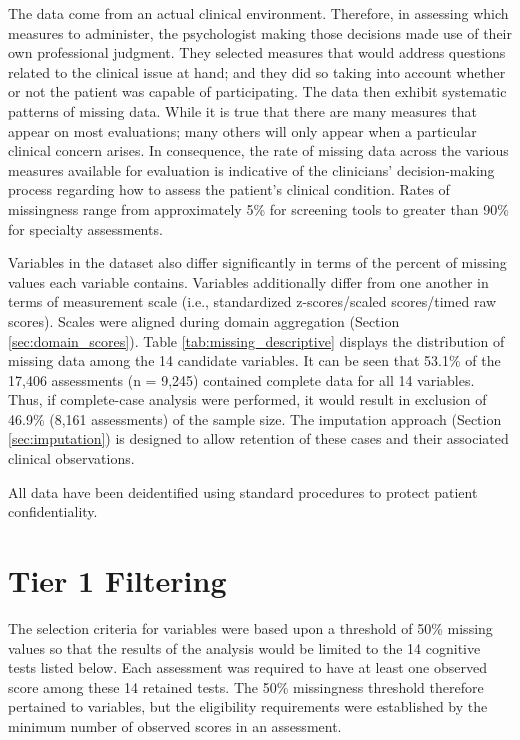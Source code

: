 The data come from an actual clinical environment. Therefore, in assessing which measures to administer, the psychologist making those decisions made use of their own professional judgment. They selected measures that would address questions related to the clinical issue at hand; and they did so taking into account whether or not the patient was capable of participating. The data then exhibit systematic patterns of missing data. While it is true that there are many measures that appear on most evaluations; many others will only appear when a particular clinical concern arises. In consequence, the rate of missing data across the various measures available for evaluation is indicative of the clinicians' decision-making process regarding how to assess the patient's clinical condition. Rates of missingness range from approximately 5\% for screening tools to greater than 90\% for specialty assessments.

Variables in the dataset also differ significantly in terms of the percent of missing values each variable contains. Variables additionally differ from one another in terms of measurement scale (i.e., standardized z-scores/scaled scores/timed raw scores). Scales were aligned during domain aggregation (Section \ref{sec:domain_scores}). Table \ref{tab:missing_descriptive} displays the distribution of missing data among the 14 candidate variables. It can be seen that 53.1\% of the 17,406 assessments (n = 9,245) contained complete data for all 14 variables. Thus, if complete-case analysis were performed, it would result in exclusion of 46.9\% (8,161 assessments) of the sample size. The imputation approach (Section \ref{sec:imputation}) is designed to allow retention of these cases and their associated clinical observations.

All data have been deidentified using standard procedures to protect patient confidentiality.

\section{Tier 1 Filtering}\label{sec:filtering}
The selection criteria for variables were based upon a threshold of 50\% missing values so that the results of the analysis would be limited to the 14 cognitive tests listed below. Each assessment was required to have at least one observed score among these 14 retained tests. The 50\% missingness threshold therefore pertained to variables, but the eligibility requirements were established by the minimum number of observed scores in an assessment.

